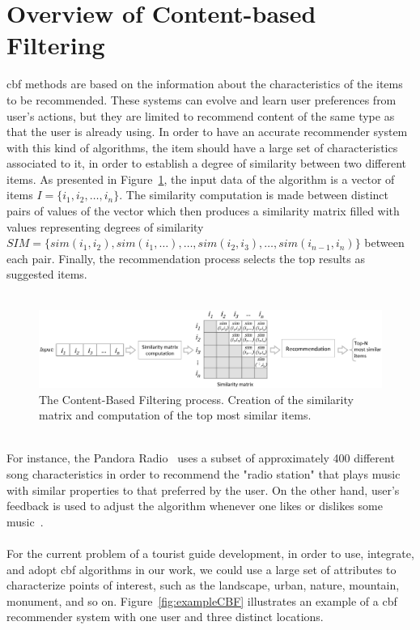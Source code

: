 \section{Overview of Content-based Filtering}
\label{sec:oftcbf}
\gls{cbf} methods are based on the information about the characteristics of the items to be recommended. These systems can evolve and learn user preferences from user's actions, but they are limited to recommend content of the same type as that the user is already using. In order to have an accurate recommender system with this kind of algorithms, the item should have a large set of characteristics associated to it, in order to establish a degree of similarity between two different items. 
As presented in Figure~\ref{fig:itemBasedProcess}, the input data of the algorithm is a vector
of items $I = \{i_{1}, i_{2}, \dots,  i_{n}\}$. The similarity computation is made between distinct pairs of values of the vector which then produces a similarity matrix filled with values representing
degrees of similarity $SIM = \{sim(i_{1},i_{2}), sim(i_{1}, {\dots}), \dots , sim(i_{2},i_{3}), \dots, sim(i_{n-1},i_{n})\}$ between each pair.
Finally, the recommendation process selects the top results as suggested items.\\
\\
\begin{figure}[h!]
 \centering
   \includegraphics[width=12cm]{./images/flows/flow_content_based_filtering_diagram.jpg}
   \caption{The Content-Based Filtering process. Creation of the similarity matrix and computation of the top most similar items.}
   \label{fig:itemBasedProcess}
\end{figure}
\\
For instance, the Pandora Radio~\cite{pandoraInternetradio} uses a subset of approximately 400 different song characteristics in order to recommend the "radio station" that plays music with similar properties to that preferred by the user. On the other hand, user's feedback is used to adjust the algorithm whenever one likes or dislikes some music~\cite{recommenderSystemWiki}.\\
\\
For the current problem of a tourist guide development, in order to use, integrate, and adopt \gls{cbf} algorithms in our work, we could use a large set of attributes to characterize points of interest, such as the landscape, urban, nature, mountain, monument, and so on. Figure~\ref{fig:exampleCBF} illustrates an example of a \gls{cbf} recommender system with one user and three distinct locations.\\
